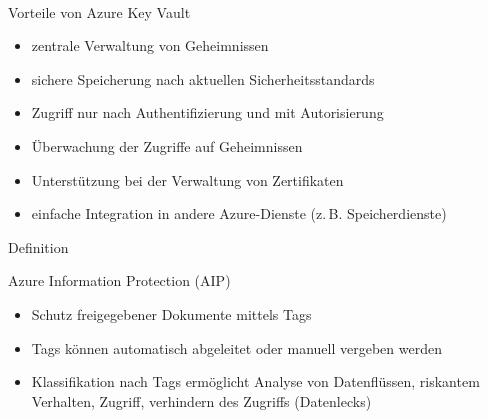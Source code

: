 \documentclass{scrartcl}
\newenvironment{flashcard}[2][]{%
    #1
    \vfill
    \centerline{\Large{#2}}
    \vfill
\newpage
}
{\newpage}
\begin{document}
    \begin{flashcard}[\ ]{Vorteile von Azure Key Vault}
        \begin{itemize}
            \item zentrale Verwaltung von Geheimnissen
            \item sichere Speicherung nach aktuellen Sicherheitsstandards
            \item Zugriff nur nach Authentifizierung und mit Autorisierung
            \item Überwachung der Zugriffe auf Geheimnissen
            \item Unterstützung bei der Verwaltung von Zertifikaten
            \item einfache Integration in andere Azure-Dienste (z.\,B. Speicherdienste)
        \end{itemize}

    \end{flashcard}

    \begin{flashcard}[Definition]{Azure Information Protection (AIP)}
        \begin{itemize}
            \item Schutz freigegebener Dokumente mittels Tags
            \item Tags können automatisch abgeleitet oder manuell vergeben werden
            \item Klassifikation nach Tags ermöglicht Analyse von Datenflüssen, riskantem Verhalten, Zugriff, verhindern des Zugriffs (Datenlecks)
        \end{itemize}
    \end{flashcard}
\end{document}
